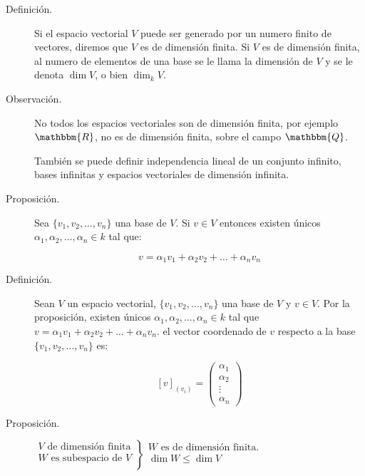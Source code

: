 \documentclass[12pt]{article}
\begin{document}
\begin{description}
\item [Definición.] Si el espacio vectorial $V$ puede ser generado por un numero finito de vectores, diremos que $V$ es de dimensión finita. Si $V$ es de dimensión finita, al numero de elementos de una base se le llama la dimensión de $V$ y se le denota $\dim{V}$, o bien $\dim_k{V}$.

\item [Observación.] No todos los espacios vectoriales son de dimensión finita, por ejemplo $\mathbbm{R}$, no es de dimensión finita, sobre el campo $\mathbbm{Q}$.

También se puede definir independencia lineal de un conjunto infinito, bases infinitas y espacios vectoriales de dimensión infinita.

\item [Proposición.] Sea $\{ v_1, v_2, \dots, v_n \}$ una base de $V$. Si $v \in V$ entonces existen únicos $\alpha_1, \alpha_2, \dots, \alpha_n \in k$ tal que:

\begin{equation}
v = \alpha_1 v_1 + \alpha_2 v_2 + \dots + \alpha_n v_n
\end{equation}

\item [Definición.] Sean $V$ un espacio vectorial, $\{ v_1, v_2, \dots, v_n \}$ una base de $V$ y $v \in V$. Por la proposición, existen únicos $\alpha_1, \alpha_2, \dots, \alpha_n \in k$ tal que $v = \alpha_1 v_1 + \alpha_2 v_2 + \dots + \alpha_n v_n$. el vector coordenado de $v$ respecto a la base $\{ v_1, v_2, \dots, v_n \}$ es:

\begin{equation}
\left[ v \right] _{( v_i )} =
\begin{pmatrix}
\alpha_1 \\
\alpha_2 \\
\vdots \\
\alpha_n
\end{pmatrix}
\end{equation}

\item [Proposición.]

\begin{math}
\left.
\begin{array}{r}
V \text{ de dimensión finita} \\
W \text{ es subespacio de } V \\
\end{array}
\right\}
\begin{array}{l}
W \text{ es de dimensión finita.} \\
\dim{W} \le \dim{V}				  \\
\end{array}
\end{math}


\end{description}
\end{document}
